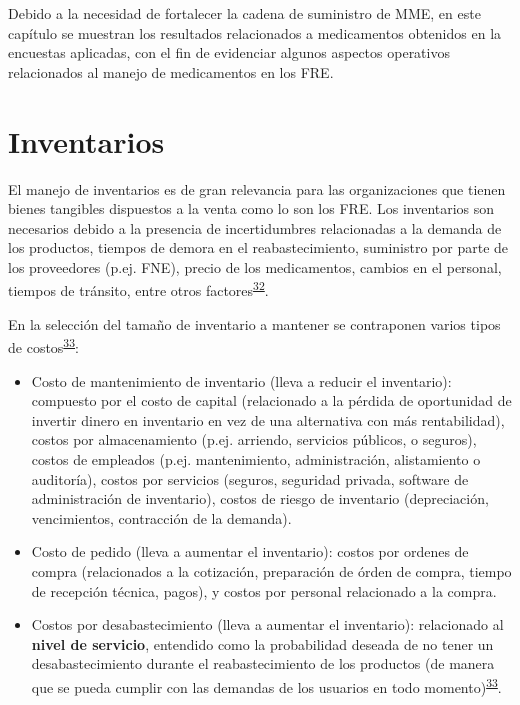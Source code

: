 \documentclass[
]{book}
\begin{document}
Debido a la necesidad de fortalecer la cadena de suministro de MME, en este capítulo se muestran los resultados relacionados a medicamentos obtenidos en la encuestas aplicadas, con el fin de evidenciar algunos aspectos operativos relacionados al manejo de medicamentos en los FRE.

\hypertarget{inventarios}{%
\section{Inventarios}\label{inventarios}}


El manejo de inventarios es de gran relevancia para las organizaciones que tienen bienes tangibles dispuestos a la venta como lo son los FRE. Los inventarios son necesarios debido a la presencia de incertidumbres relacionadas a la demanda de los productos, tiempos de demora en el reabastecimiento, suministro por parte de los proveedores (p.ej. FNE), precio de los medicamentos, cambios en el personal, tiempos de tránsito, entre otros factores\textsuperscript{\protect\hyperlink{ref-Nahmias2007}{32}}.

En la selección del tamaño de inventario a mantener se contraponen varios tipos de costos\textsuperscript{\protect\hyperlink{ref-Krajewski2016}{33}}:

\begin{itemize}
\item
  Costo de mantenimiento de inventario (lleva a reducir el inventario): compuesto por el costo de capital (relacionado a la pérdida de oportunidad de invertir dinero en inventario en vez de una alternativa con más rentabilidad), costos por almacenamiento (p.ej. arriendo, servicios públicos, o seguros), costos de empleados (p.ej. mantenimiento, administración, alistamiento o auditoría), costos por servicios (seguros, seguridad privada, software de administración de inventario), costos de riesgo de inventario (depreciación, vencimientos, contracción de la demanda).
\item
  Costo de pedido (lleva a aumentar el inventario): costos por ordenes de compra (relacionados a la cotización, preparación de órden de compra, tiempo de recepción técnica, pagos), y costos por personal relacionado a la compra.
\item
  Costos por desabastecimiento (lleva a aumentar el inventario): relacionado al \textbf{nivel de servicio}, entendido como la probabilidad deseada de no tener un desabastecimiento durante el reabastecimiento de los productos (de manera que se pueda cumplir con las demandas de los usuarios en todo momento)\textsuperscript{\protect\hyperlink{ref-Krajewski2016}{33}}.
\end{itemize}
\end{document}

